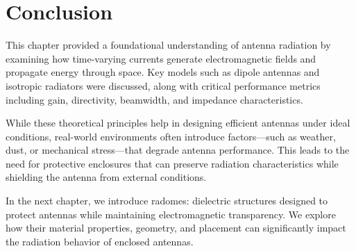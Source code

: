 \section*{Conclusion}

This chapter provided a foundational understanding of antenna radiation by examining how time-varying currents generate electromagnetic fields and propagate energy through space. Key models such as dipole antennas and isotropic radiators were discussed, along with critical performance metrics including gain, directivity, beamwidth, and impedance characteristics.

While these theoretical principles help in designing efficient antennas under ideal conditions, real-world environments often introduce factors—such as weather, dust, or mechanical stress—that degrade antenna performance. This leads to the need for protective enclosures that can preserve radiation characteristics while shielding the antenna from external conditions.

In the next chapter, we introduce radomes: dielectric structures designed to protect antennas while maintaining electromagnetic transparency. We explore how their material properties, geometry, and placement can significantly impact the radiation behavior of enclosed antennas.

